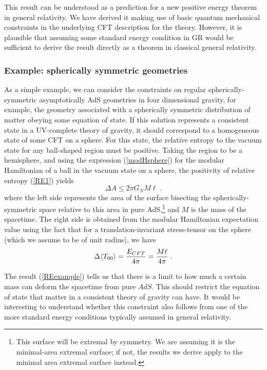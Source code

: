 \documentclass[12pt,epsf]{article}
\newcommand{\be}{\begin{equation}}
\newcommand{\ee}{\end{equation}}
\begin{document}
This result can be understood as a prediction for a new positive energy theorem in general relativity. We have derived it making use of basic quantum mechanical constraints in the underlying CFT description for the theory. However, it is plausible that assuming some standard energy condition in GR would be sufficient to derive the result directly as a theorem in classical general relativity.

\subsubsection*{Example: spherically symmetric geometries}

As a simple example, we can consider the constraints on regular spherically-symmetric asymptotically AdS geometries in four dimensional gravity, for example, the geometry associated with a spherically symmetric distribution of matter obeying some equation of state. If this solution represents a consistent state in a UV-complete theory of gravity, it should correspond to a homogeneous state of some CFT on a sphere. For this state, the relative entropy to the vacuum state for any ball-shaped region must be positive. Taking the region to be a hemisphere, and using the expression (\ref{modHsphere}) for the modular Hamiltonian of a ball in the vacuum state on a sphere, the positivity of relative entropy (\ref{RE1}) yields \cite{Lashkari:2014kda}
\be
\label{REexample}
\Delta A \le 2 \pi G_N  M \ell \; .
\ee
where the left side represents the area of the surface bisecting the spherically-symmetric space relative to this area in pure AdS,\footnote{This surface will be extremal by symmetry. We are assuming it is the minimal-area extremal surface; if not, the results we derive apply to the minimal area extremal surface instead.} and $M$ is the mass of the spacetime. The right side is obtained from the modular Hamiltonian expectation value using the fact that for a translation-invariant stress-tensor on the sphere (which we assume to be of unit radius), we have
\be
\label{spherestress}
\Delta \langle T_{00} \rangle = {E_{CFT} \over 4 \pi} = {M \ell \over 4 \pi} \; .
\ee

The result (\ref{REexample}) tells us that there is a limit to how much a certain mass can deform the spacetime from pure $AdS$. This should restrict the equation of state that matter in a consistent theory of gravity can have. It would be interesting to understand whether this constraint also follows from one of the more standard energy conditions typically assumed in general relativity.
\end{document}
